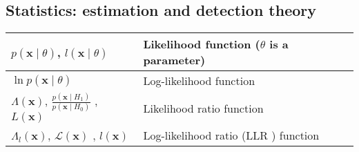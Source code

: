 \subsection{Statistics: estimation and detection theory}
\begin{xltabular}{\textwidth}{XX}
    \(p(\mathbf{x} \mid \theta)\), \(l(\mathbf{x} \mid \theta)\)\cite{leon-garciaProbabilityStatisticsRandom2007}                                                                                                                   & Likelihood function (\(\theta\) is a parameter)                                                                                                                                                                                                                                                                                                                    \\ \hline
	\(\ln{p(\mathbf{x} \mid \theta)}\)                                                                                                                   & Log-likelihood function                                                                                                                                                                                                                                                                                                                    \\ \hline
	\(\Lambda(\mathbf{x})\)\cite{leon-garciaProbabilityStatisticsRandom2007}, \(\frac{p(\mathbf{x} \mid H_1)}{p(\mathbf{x} \mid H_0)}\) \cite{leon-garciaProbabilityStatisticsRandom2007,kayFundamentalsStatisticalProcessing2009}, \(L(\mathbf{x})\) \cite{kayFundamentalsStatisticalProcessing2009,CharlesPES}                                                                                                                   & Likelihood ratio function                                                                                                                                                                                                                                                                                                                    \\ \hline
	\(\Lambda_l(\mathbf{x})\), \(\mathcal{L}(\mathbf{x})\) \cite{CharlesPES}, \(l(\mathbf{x})\) \cite{kayFundamentalsStatisticalProcessing2009}                                                                                                                   & Log-likelihood ratio (LLR \cite{kayFundamentalsStatisticalProcessing2009}) function                                                                                                                                                                                                                                                                                                                    \\ \hline

\end{xltabular}
